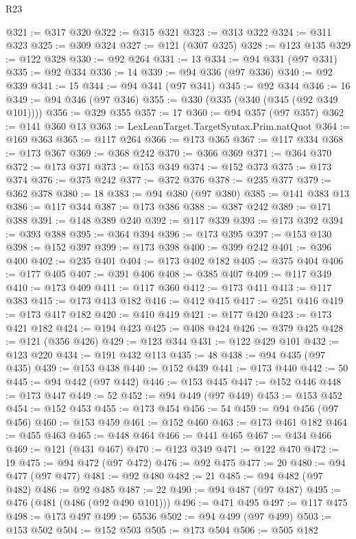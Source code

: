 \begin{lexlean}{R23}
\begin{coremodule}
@321 := @317 @320
@322 := @315 @321
@323 := @313 @322
@324 := @311 @323
@325 := @309 @324
@327 := @121 (@307 @325)
@328 := @123 @135
@329 := @122 @328
@330 := @92 @264
@331 := 13
@334 := @94 @331 (@97 @331)
@335 := @92 @334
@336 := 14
@339 := @94 @336 (@97 @336)
@340 := @92 @339
@341 := 15
@344 := @94 @341 (@97 @341)
@345 := @92 @344
@346 := 16
@349 := @94 @346 (@97 @346)
@355 := @330 (@335 (@340 (@345 (@92 @349 @101))))
@356 := @329 @355
@357 := 17
@360 := @94 @357 (@97 @357)
@362 := @141 @360 @13
@363 := LexLeanTarget.TargetSyntax.Prim.natQuot
@364 := @169 @363
@365 := @117 @264
@366 := @173 @365
@367 := @117 @334
@368 := @173 @367
@369 := @368 @242
@370 := @366 @369
@371 := @364 @370
@372 := @173 @371
@373 := @153 @349
@374 := @152 @373
@375 := @173 @374
@376 := @375 @242
@377 := @372 @376
@378 := @235 @377
@379 := @362 @378
@380 := 18
@383 := @94 @380 (@97 @380)
@385 := @141 @383 @13
@386 := @117 @344
@387 := @173 @386
@388 := @387 @242
@389 := @171 @388
@391 := @148 @389 @240
@392 := @117 @339
@393 := @173 @392
@394 := @393 @388
@395 := @364 @394
@396 := @173 @395
@397 := @153 @130
@398 := @152 @397
@399 := @173 @398
@400 := @399 @242
@401 := @396 @400
@402 := @235 @401
@404 := @173 @402 @182
@405 := @375 @404
@406 := @177 @405
@407 := @391 @406
@408 := @385 @407
@409 := @117 @349
@410 := @173 @409
@411 := @117 @360
@412 := @173 @411
@413 := @117 @383
@415 := @173 @413 @182
@416 := @412 @415
@417 := @251 @416
@419 := @173 @417 @182
@420 := @410 @419
@421 := @177 @420
@423 := @173 @421 @182
@424 := @194 @423
@425 := @408 @424
@426 := @379 @425
@428 := @121 (@356 @426)
@429 := @123 @344
@431 := @122 @429 @101
@432 := @123 @220
@434 := @191 @432 @113
@435 := 48
@438 := @94 @435 (@97 @435)
@439 := @153 @438
@440 := @152 @439
@441 := @173 @440
@442 := 50
@445 := @94 @442 (@97 @442)
@446 := @153 @445
@447 := @152 @446
@448 := @173 @447
@449 := 52
@452 := @94 @449 (@97 @449)
@453 := @153 @452
@454 := @152 @453
@455 := @173 @454
@456 := 54
@459 := @94 @456 (@97 @456)
@460 := @153 @459
@461 := @152 @460
@463 := @173 @461 @182
@464 := @455 @463
@465 := @448 @464
@466 := @441 @465
@467 := @434 @466
@469 := @121 (@431 @467)
@470 := @123 @349
@471 := @122 @470
@472 := 19
@475 := @94 @472 (@97 @472)
@476 := @92 @475
@477 := 20
@480 := @94 @477 (@97 @477)
@481 := @92 @480
@482 := 21
@485 := @94 @482 (@97 @482)
@486 := @92 @485
@487 := 22
@490 := @94 @487 (@97 @487)
@495 := @476 (@481 (@486 (@92 @490 @101)))
@496 := @471 @495
@497 := @117 @475
@498 := @173 @497
@499 := 65536
@502 := @94 @499 (@97 @499)
@503 := @153 @502
@504 := @152 @503
@505 := @173 @504
@506 := @505 @182

\end{coremodule}
\end{lexlean}
